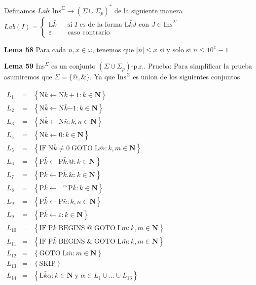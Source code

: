 Definamos \(Lab:\mathrm{Ins}^{\Sigma }\rightarrow (\Sigma \cup \Sigma _{p})^{\ast }\) de la siguiente manera
\(\displaystyle Lab(I)=\left\{ \begin{array}{lll} \mathrm{L}\bar{k} & & \text{si }I\text{ es de la forma }\mathrm{L}\bar{k}J \text{ con }J\in \mathrm{Ins}^{\Sigma } \\ \varepsilon & & \text{caso contrario} \end{array} \right. \)



\textbf{Lema 58} Para cada \(n,x\in \omega \), tenemos que \( \left\vert \bar{n}\right\vert \leq x\) si y solo si \(n\leq 10^{x}-1\)



\textbf{Lema 59} \(\mathrm{Ins}^{\Sigma }\) es un conjunto \((\Sigma \cup \Sigma _{p})\)-p.r..
Prueba: Para simplificar la prueba asumiremos que \(\Sigma =\{@,\& \}\). Ya que \( \mathrm{Ins}^{\Sigma }\) es union de los siguientes conjuntos

\(\displaystyle \begin{array}{rcl} L_{1} & =& \left\{ \mathrm{N}\bar{k}\leftarrow \mathrm{N}\bar{k}+1:k\in \mathbf{N}\right\} \\ L_{2} & =& \left\{ \mathrm{N}\bar{k}\leftarrow \mathrm{N}\bar{k}\dot{-}1:k\in \mathbf{N}\right\} \\ L_{3} & =& \left\{ \mathrm{N}\bar{k}\leftarrow \mathrm{N}\bar{n}:k,n\in \mathbf{N}\right\} \\ L_{4} & =& \left\{ \mathrm{N}\bar{k}\leftarrow 0:k\in \mathbf{N}\right\} \\ L_{5} & =& \left\{ \mathrm{IF}\;\mathrm{N}\bar{k}\neq 0\;\mathrm{GOTO}\; \mathrm{L}\bar{m}:k,m\in \mathbf{N}\right\} \\ L_{6} & =& \left\{ \mathrm{P}\bar{k}\leftarrow \mathrm{P}\bar{k}.@:k\in \mathbf{N}\right\} \\ L_{7} & =& \left\{ \mathrm{P}\bar{k}\leftarrow \mathrm{P}\bar{k}.\& :k\in \mathbf{N}\right\} \\ L_{8} & =& \left\{ \mathrm{P}\bar{k}\leftarrow \text{ }^{\curvearrowright } \mathrm{P}\bar{k}:k\in \mathbf{N}\right\} \\ L_{9} & =& \left\{ \mathrm{P}\bar{k}\leftarrow \mathrm{P}\bar{n}:k,n\in \mathbf{N}\right\} \\ L_{9} & =& \left\{ \mathrm{P}\bar{k}\leftarrow \varepsilon :k\in \mathbf{N} \right\} \\ L_{10} & =& \left\{ \mathrm{IF}\;\mathrm{P}\bar{k}\;\mathrm{BEGINS}\;@\; \mathrm{GOTO}\;\mathrm{L}\bar{m}:k,m\in \mathbf{N}\right\} \\ L_{11} & =& \left\{ \mathrm{IF}\;\mathrm{P}\bar{k}\;\mathrm{BEGINS}\;\& \; \mathrm{GOTO}\;\mathrm{L}\bar{m}:k,m\in \mathbf{N}\right\} \\ L_{12} & =& \left\{ \mathrm{GOTO}\;\mathrm{L}\bar{m}:m\in \mathbf{N}\right\} \\ L_{13} & =& \left\{ \mathrm{SKIP}\right\} \\ L_{14} & =& \left\{ \mathrm{L}\bar{k}\alpha :k\in \mathbf{N\;}\text{y }\alpha \in L_{1}\cup ...\cup L_{13}\right\} \end{array} \)

